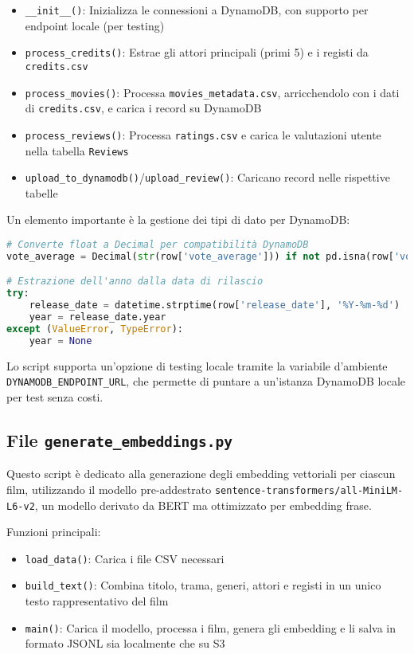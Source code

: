 \documentclass[11pt,a4paper]{article}
\begin{document}
\begin{itemize}
  \item \texttt{\_\_init\_\_()}: Inizializza le connessioni a DynamoDB, con supporto per endpoint locale (per testing)
  \item \texttt{process\_credits()}: Estrae gli attori principali (primi 5) e i registi da \texttt{credits.csv}
  \item \texttt{process\_movies()}: Processa \texttt{movies\_metadata.csv}, arricchendolo con i dati di \texttt{credits.csv}, e carica i record su DynamoDB
  \item \texttt{process\_reviews()}: Processa \texttt{ratings.csv} e carica le valutazioni utente nella tabella \texttt{Reviews}
  \item \texttt{upload\_to\_dynamodb()}/\texttt{upload\_review()}: Caricano record nelle rispettive tabelle
\end{itemize}

Un elemento importante è la gestione dei tipi di dato per DynamoDB:
\begin{lstlisting}[language=Python]
# Converte float a Decimal per compatibilità DynamoDB
vote_average = Decimal(str(row['vote_average'])) if not pd.isna(row['vote_average']) else Decimal('0')

# Estrazione dell'anno dalla data di rilascio
try:
    release_date = datetime.strptime(row['release_date'], '%Y-%m-%d')
    year = release_date.year
except (ValueError, TypeError):
    year = None
\end{lstlisting}

Lo script supporta un'opzione di testing locale tramite la variabile d'ambiente \texttt{DYNAMODB\_ENDPOINT\_URL}, che permette di puntare a un'istanza DynamoDB locale per test senza costi.

\subsection{File \texttt{generate\_embeddings.py}}
Questo script è dedicato alla generazione degli embedding vettoriali per ciascun film, utilizzando il modello pre-addestrato \texttt{sentence-transformers/all-MiniLM-L6-v2}, un modello derivato da BERT ma ottimizzato per embedding frase.

Funzioni principali:

\begin{itemize}
  \item \texttt{load\_data()}: Carica i file CSV necessari
  \item \texttt{build\_text()}: Combina titolo, trama, generi, attori e registi in un unico testo rappresentativo del film
  \item \texttt{main()}: Carica il modello, processa i film, genera gli embedding e li salva in formato JSONL sia localmente che su S3
\end{itemize}
\end{document}
